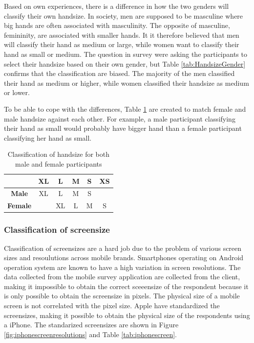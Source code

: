     Based on own experiences, there is a difference in how the two genders will classify their own handsize. In society, men are supposed to be masculine where big hands are often associated with masculinity. The opposite of masculine, femininity, are associated with smaller hands. It it therefore believed that men will classify their hand as medium or large, while women want to classify their hand as small or medium. The question in survey were asking the participants to select their handsize based on their own gender, but Table \ref{tab:HandsizeGender} confirms that the classification are biased. The majority of the men classified their hand as medium or higher, while women classified their handsize as medium or lower. 

    To be able to cope with the differences, Table \ref{tab:classificationhandsize} are created to match female and male handsize against each other. For example, a male participant classifying their hand as small would probably have bigger hand than a female participant classifying her hand as small. 

    \begin{table}[H]
      \centering
      \begin{tabular}{ c || c | c | c | c | c }
        \hline
         & {\bf XL} & {\bf L} & {\bf M} & {\bf S} & {\bf XS} \\ \hline\hline
        {\bf Male}   & XL & L  & M & S &   \\
        {\bf Female} &    & XL & L & M & S \\ \hline
      \end{tabular}
      \caption{Classification of handsize for both male and female participants}
      \label{tab:classificationhandsize}
    \end{table}

    \subsubsection{Classification of screensize}


    Classification of screensizes are a hard job due to the problem of various screen sizes and resoulutions across mobile brands. Smartphones operating on Android operation system are known to have a high variation in screen resolutions. The data collected from the mobile survey application are collected from the client, making it impossible to obtain the correct sceeensize of the respondent because it is only possible to obtain the screensize in pixels. The physical size of a mobile screen is not correlated with the pixel size. Apple have standardized the screensizes, making it possible to obtain the physical size of the respondents using a iPhone. The standarized screensizes are shown in Figure \ref{fig:iphonescreenresolutions} and Table \ref{tab:iphonescreen}.

